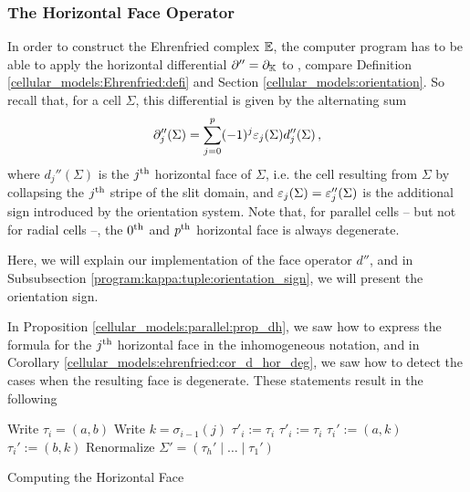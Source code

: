 \subsubsection{The Horizontal Face Operator}
\label{program:kappa:tuple:d_hor}

In order to construct the Ehrenfried complex $\mathbb E$, 
the computer program has to be able to apply the horizontal differential $\partial'' = \partial_\mathbb K$ to , 
compare Definition \ref{cellular_models:Ehrenfried:defi} and Section \ref{cellular_models:orientation}.
So recall that, for a cell $\Sigma$, this differential is given by the alternating sum
\[
 \partial''_j(\Sigma) = \sum_{j = 0}^p (-1)^j \varepsilon_j(\Sigma) d_j''(\Sigma)\,,
\]
where $d_j''(\Sigma)$ is the $j^{\text{th}}$ horizontal face of $\Sigma$, 
i.e. the cell resulting from $\Sigma$ by collapsing the $j^{\text{th}}$ stripe of the slit domain,
and $\varepsilon_j(\Sigma) = \varepsilon_j''(\Sigma)$ is the additional sign introduced by the orientation system.
Note that, for parallel cells -- but not for radial cells --, the $0^{\text{th}}$ and $p^{\text{th}}$ horizontal face is always degenerate.

Here, we will explain our implementation of the face operator $d''$, 
and in Subsubsection \ref{program:kappa:tuple:orientation_sign}, we will present the orientation sign.

In Proposition \ref{cellular_models:parallel:prop_dh}, 
we saw how to express the formula for the $j^{\text{th}}$ horizontal face in the inhomogeneous notation,
and in Corollary \ref{cellular_models:ehrenfried:cor_d_hor_deg}, we saw how to detect the cases when the resulting face is degenerate.
These statements result in the following

\begin{algorithm}[H]
\label{d_hor}
\DontPrintSemicolon
{}

{
	Write $\tau_i = (a, b)$\;
	Write $k = \sigma_{i-1}(j)$\;
	{
	  $\tau'_i := \tau_i$\;
	}
	{
	  \;
	}
	\Else
	{
	  {
	    $\tau'_i := \tau_i$\;
	  }
	  \Else
	  {
	    {
	      $\tau_i' := (a, k)$\; 
	    }
	    \Else
	    {
	      $\tau_i' := (b, k)$\;
	    }
	  }
	}
}
Renormalize $\Sigma' = (\tau_h' \mid \ldots \mid \tau_1')$\;
\;

\caption{Computing the Horizontal Face}

\end{algorithm}

